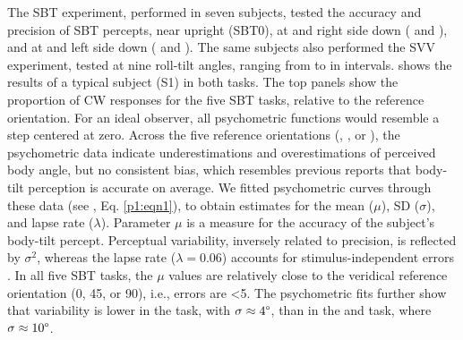 The SBT experiment, performed in seven subjects, tested the accuracy and precision of SBT percepts, near upright (SBT0), at  and  right side down ( and ), and at  and  left side down ( and ). The same subjects also performed the SVV experiment, tested at nine roll-tilt angles, ranging from  to  in  intervals.  shows the results of a typical subject (S1) in both tasks. The top panels show the proportion of CW responses for the five SBT tasks, relative to the reference orientation. For an ideal observer, all psychometric functions would resemble a step centered at zero. Across the five reference orientations (, , or ), the psychometric data indicate underestimations and overestimations of perceived body angle, but no consistent bias, which resembles previous reports \cite{mittelstaedt1983, mast1996, jarchow1999, vanbeuzekom2001} that body-tilt perception is accurate on average. We fitted psychometric curves through these data (see , Eq. \ref{p1:eqn1}), to obtain estimates for the mean ($\mu$), SD ($\sigma$), and lapse rate ($\lambda$). Parameter $\mu$ is a measure for the accuracy of the subject's body-tilt percept. Perceptual variability, inversely related to precision, is reflected by $\sigma^2$, whereas the lapse rate ($\lambda = 0.06$) accounts for stimulus-independent errors \cite{wichmann2001}. In all five SBT tasks, the $\mu$ values are relatively close to the veridical reference orientation (0\textdegree, 45\textdegree, or 90\textdegree), i.e., errors are \textless5\textdegree. The psychometric fits further show that variability is lower in the  task, with $\sigma \approx 4\degree$, than in the  and  task, where $\sigma \approx 10\degree$. 

